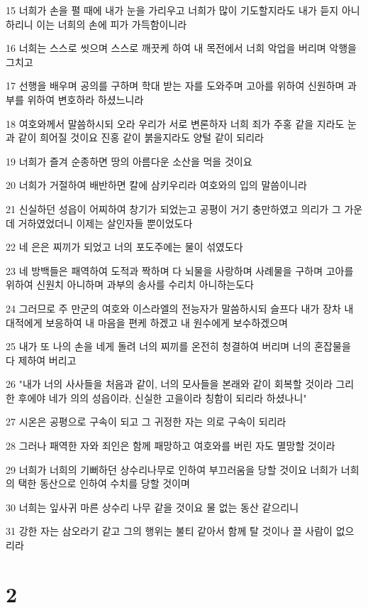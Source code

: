 \par 15 너희가 손을 펼 때에 내가 눈을 가리우고 너희가 많이 기도할지라도 내가 듣지 아니하리니 이는 너희의 손에 피가 가득함이니라
\par 16 너희는 스스로 씻으며 스스로 깨끗케 하여 내 목전에서 너희 악업을 버리며 악행을 그치고
\par 17 선행을 배우며 공의를 구하며 학대 받는 자를 도와주며 고아를 위하여 신원하며 과부를 위하여 변호하라 하셨느니라
\par 18 여호와께서 말씀하시되 오라 우리가 서로 변론하자 너희 죄가 주홍 같을 지라도 눈과 같이 희어질 것이요 진홍 같이 붉을지라도 양털 같이 되리라
\par 19 너희가 즐겨 순종하면 땅의 아름다운 소산을 먹을 것이요
\par 20 너희가 거절하여 배반하면 칼에 삼키우리라 여호와의 입의 말씀이니라
\par 21 신실하던 성읍이 어찌하여 창기가 되었는고 공평이 거기 충만하였고 의리가 그 가운데 거하였었더니 이제는 살인자들 뿐이었도다
\par 22 네 은은 찌끼가 되었고 너의 포도주에는 물이 섞였도다
\par 23 네 방백들은 패역하여 도적과 짝하며 다 뇌물을 사랑하며 사례물을 구하며 고아를 위하여 신원치 아니하며 과부의 송사를 수리치 아니하는도다
\par 24 그러므로 주 만군의 여호와 이스라엘의 전능자가 말씀하시되 슬프다 내가 장차 내 대적에게 보응하여 내 마음을 편케 하겠고 내 원수에게 보수하겠으며
\par 25 내가 또 나의 손을 네게 돌려 너의 찌끼를 온전히 청결하여 버리며 너의 혼잡물을 다 제하여 버리고
\par 26 "내가 너의 사사들을 처음과 같이, 너의 모사들을 본래와 같이 회복할 것이라 그리한 후에야 네가 의의 성읍이라, 신실한 고을이라 칭함이 되리라 하셨나니"
\par 27 시온은 공평으로 구속이 되고 그 귀정한 자는 의로 구속이 되리라
\par 28 그러나 패역한 자와 죄인은 함께 패망하고 여호와를 버린 자도 멸망할 것이라
\par 29 너희가 너희의 기뻐하던 상수리나무로 인하여 부끄러움을 당할 것이요 너희가 너희의 택한 동산으로 인하여 수치를 당할 것이며
\par 30 너희는 잎사귀 마른 상수리 나무 같을 것이요 물 없는 동산 같으리니
\par 31 강한 자는 삼오라기 같고 그의 행위는 불티 같아서 함께 탈 것이나 끌 사람이 없으리라

\chapter{2}

